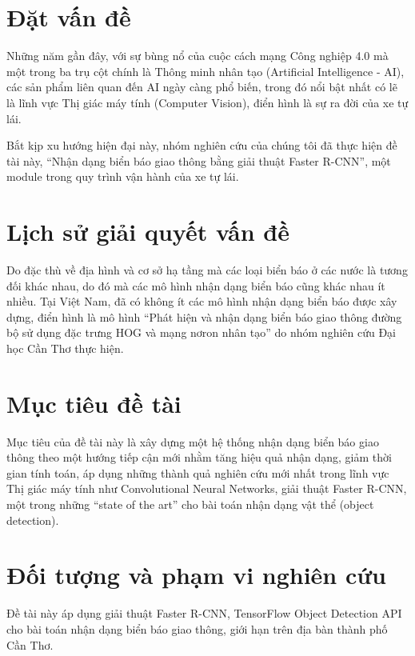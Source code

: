 \documentclass[../thesis.tex]{subfiles}
\begin{document}
\section{Đặt vấn đề}

Những năm gần đây, với sự bùng nổ của cuộc cách mạng Công nghiệp 4.0 mà một trong ba trụ cột chính là Thông minh nhân tạo (Artificial Intelligence - AI), các sản phẩm liên quan đến AI ngày càng phổ biến, trong đó nổi bật nhất có lẽ là lĩnh vực Thị giác máy tính (Computer Vision), điển hình là sự ra đời của xe tự lái. 

Bắt kịp xu hướng hiện đại này, nhóm nghiên cứu của chúng tôi đã thực hiện đề tài này, ``Nhận dạng biển báo giao thông bằng giải thuật Faster R-CNN'', một module trong quy trình vận hành của xe tự lái.

\section{Lịch sử giải quyết vấn đề}

Do đặc thù về địa hình và cơ sở hạ tầng mà các loại biển báo ở các nước là tương đối khác nhau, do đó mà các mô hình nhận dạng biển báo cũng khác nhau ít nhiều. Tại Việt Nam, đã có không ít các mô hình nhận dạng biển báo được xây dựng, điển hình là mô hình ``Phát hiện và nhận dạng biển báo giao thông đường bộ sử dụng đặc trưng HOG và mạng nơron nhân tạo'' do nhóm nghiên cứu Đại học Cần Thơ thực hiện.

\section{Mục tiêu đề tài}

Mục tiêu của đề tài này là xây dựng một hệ thống nhận dạng biển báo giao thông theo một hướng tiếp cận mới nhằm tăng hiệu quả nhận dạng, giảm thời gian tính toán, áp dụng những thành quả nghiên cứu mới nhất trong lĩnh vực Thị giác máy tính như Convolutional Neural Networks, giải thuật Faster R-CNN, một trong những ``state of the art'' cho bài toán nhận dạng vật thể (object detection).

\section{Đối tượng và phạm vi nghiên cứu}

Đề tài này áp dụng giải thuật Faster R-CNN, TensorFlow Object Detection API cho bài toán nhận dạng biển báo giao thông, giới hạn trên địa bàn thành phố Cần Thơ. 
\end{document}
